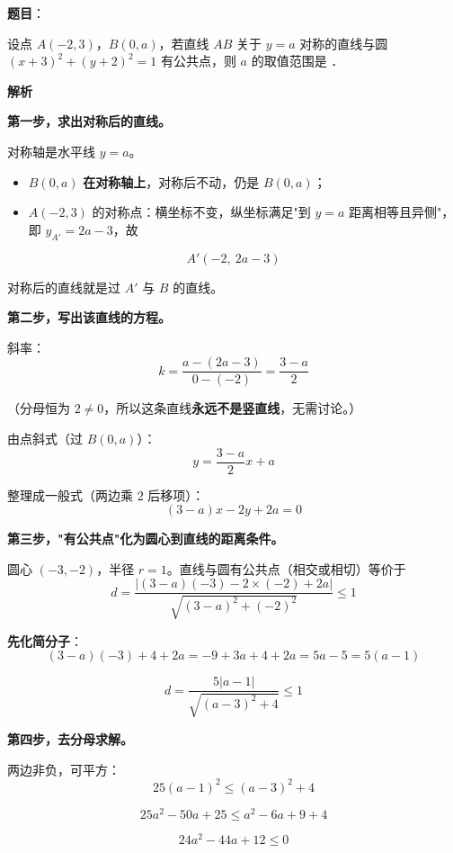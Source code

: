 \begin{answer}

\textbf{题目}：

设点 $A(-2,3)$，$B(0,a)$，若直线 $AB$ 关于 $y=a$ 对称的直线与圆 $(x+3)^{2}+(y+2)^{2}=1$ 有公共点，则 $a$ 的取值范围是 \gkblank{}．

\textbf{解析}

\textbf{第一步，求出对称后的直线。}

对称轴是水平线 $y=a$。

\begin{itemize}
\item $B(0,a)$ \textbf{在对称轴上}，对称后不动，仍是 $B(0,a)$；
\item $A(-2,3)$ 的对称点：横坐标不变，纵坐标满足"到 $y=a$ 距离相等且异侧"，即 $y_{A'}=2a-3$，故
\end{itemize}
\nopagebreak[4]
\[A'(-2,\ 2a-3)\]

对称后的直线就是过 $A'$ 与 $B$ 的直线。

\textbf{第二步，写出该直线的方程。}

斜率：
\nopagebreak[4]
\[k=\frac{a-(2a-3)}{0-(-2)}=\frac{3-a}2\]

（分母恒为 $2\ne0$，所以这条直线\textbf{永远不是竖直线}，无需讨论。）

由点斜式（过 $B(0,a)$）：
\nopagebreak[4]
\[y=\frac{3-a}2x+a\]

整理成一般式（两边乘 $2$ 后移项）：
\nopagebreak[4]
\[(3-a)x-2y+2a=0\]

\textbf{第三步，"有公共点"化为圆心到直线的距离条件。}

圆心 $(-3,-2)$，半径 $r=1$。直线与圆有公共点（相交或相切）等价于
\nopagebreak[4]
\[d=\frac{|(3-a)(-3)-2\times(-2)+2a|}{\sqrt{(3-a)^{2}+(-2)^{2}}}\le1\]

\textbf{先化简分子}：
\nopagebreak[4]
\[(3-a)(-3)+4+2a=-9+3a+4+2a=5a-5=5(a-1)\]

\nopagebreak[4]
\[d=\frac{5|a-1|}{\sqrt{(a-3)^{2}+4}}\le1\]

\textbf{第四步，去分母求解。}

两边非负，可平方：
\nopagebreak[4]
\[25(a-1)^{2}\le(a-3)^{2}+4\]

\nopagebreak[4]
\[25a^{2}-50a+25\le a^{2}-6a+9+4\]

\nopagebreak[4]
\[24a^{2}-44a+12\le0\]


\end{answer}
